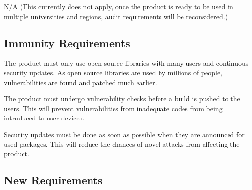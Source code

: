 \documentclass{article}
\begin{document}
N/A (This currently does not apply, once the product is ready to be used in multiple universities and regions, audit requirements will be reconsidered.)

\subsection{Immunity Requirements}

The product must only use open source libraries with many users and continuous security updates. 
As open source libraries are used by millions of people, vulnerabilities are found and patched much earlier.

The product must undergo vulnerability checks before a build is pushed to the users.
This will prevent vulnerabilities from inadequate codes from being introduced to user devices.

Security updates must be done as soon as possible when they are announced for used packages.
This will reduce the chances of novel attacks from affecting the product.

\subsection{New Requirements}
\end{document}
